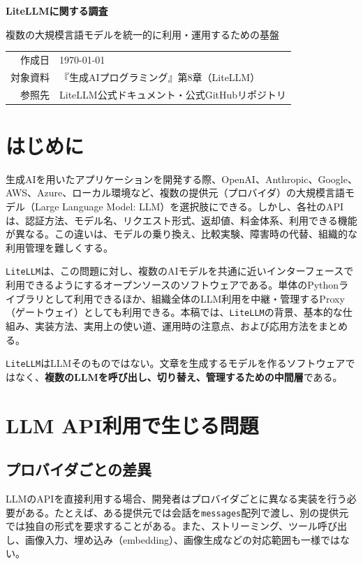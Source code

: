 \documentclass[11pt,a4paper]{bxjsarticle}
\newcommand{\litellm}{\texttt{LiteLLM}}
\begin{document}
\begin{titlepage}
  \centering
  \vspace*{35mm}
  {\LARGE\bfseries LiteLLMに関する調査\par}
  \vspace{8mm}
  {\Large 複数の大規模言語モデルを統一的に利用・運用するための基盤\par}
  \vfill
  \begin{tabular}{rl}
    作成日 & \today \\
    対象資料 & 『生成AIプログラミング』第8章（LiteLLM）\\
    参照先 & LiteLLM公式ドキュメント・公式GitHubリポジトリ
  \end{tabular}
  \vspace*{30mm}
\end{titlepage}

\tableofcontents
\newpage

\section{はじめに}
生成AIを用いたアプリケーションを開発する際、OpenAI、Anthropic、Google、AWS、Azure、ローカル環境など、複数の提供元（プロバイダ）の大規模言語モデル（Large Language Model: LLM）を選択肢にできる。しかし、各社のAPIは、認証方法、モデル名、リクエスト形式、返却値、料金体系、利用できる機能が異なる。この違いは、モデルの乗り換え、比較実験、障害時の代替、組織的な利用管理を難しくする。

\litellm{}は、この問題に対し、複数のAIモデルを共通に近いインターフェースで利用できるようにするオープンソースのソフトウェアである。単体のPythonライブラリとして利用できるほか、組織全体のLLM利用を中継・管理するProxy（ゲートウェイ）としても利用できる。本稿では、\litellm{}の背景、基本的な仕組み、実装方法、実用上の使い道、運用時の注意点、および応用方法をまとめる。

\begin{important}
\litellm{}はLLMそのものではない。文章を生成するモデルを作るソフトウェアではなく、\textbf{複数のLLMを呼び出し、切り替え、管理するための中間層}である。
\end{important}

\section{LLM API利用で生じる問題}
\subsection{プロバイダごとの差異}
LLMのAPIを直接利用する場合、開発者はプロバイダごとに異なる実装を行う必要がある。たとえば、ある提供元では会話を\texttt{messages}配列で渡し、別の提供元では独自の形式を要求することがある。また、ストリーミング、ツール呼び出し、画像入力、埋め込み（embedding）、画像生成などの対応範囲も一様ではない。
\end{document}
